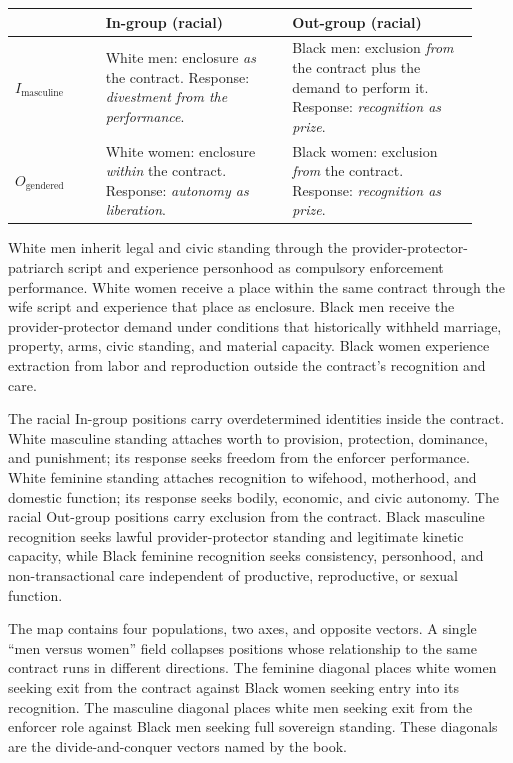 \documentclass[12pt]{article}
\begin{document}
\begin{center}
\small
\renewcommand{\arraystretch}{1.35}
\begin{tabular}{@{}p{0.18\linewidth}p{0.37\linewidth}p{0.37\linewidth}@{}}
\toprule
 & \textbf{In-group (racial)} & \textbf{Out-group (racial)} \\
\midrule
$I_{\text{masculine}}$ & White men: enclosure \textit{as} the contract. Response: \textit{divestment from the performance}. & Black men: exclusion \textit{from} the contract plus the demand to perform it. Response: \textit{recognition as prize}. \\
\addlinespace
$O_{\text{gendered}}$ & White women: enclosure \textit{within} the contract. Response: \textit{autonomy as liberation}. & Black women: exclusion \textit{from} the contract. Response: \textit{recognition as prize}. \\
\bottomrule
\end{tabular}
\end{center}

White men inherit legal and civic standing through the provider-protector-patriarch script and experience personhood as compulsory enforcement performance. White women receive a place within the same contract through the wife script and experience that place as enclosure. Black men receive the provider-protector demand under conditions that historically withheld marriage, property, arms, civic standing, and material capacity. Black women experience extraction from labor and reproduction outside the contract's recognition and care.

The racial In-group positions carry overdetermined identities inside the contract. White masculine standing attaches worth to provision, protection, dominance, and punishment; its response seeks freedom from the enforcer performance. White feminine standing attaches recognition to wifehood, motherhood, and domestic function; its response seeks bodily, economic, and civic autonomy. The racial Out-group positions carry exclusion from the contract. Black masculine recognition seeks lawful provider-protector standing and legitimate kinetic capacity, while Black feminine recognition seeks consistency, personhood, and non-transactional care independent of productive, reproductive, or sexual function.

The map contains four populations, two axes, and opposite vectors. A single “men versus women” field collapses positions whose relationship to the same contract runs in different directions. The feminine diagonal places white women seeking exit from the contract against Black women seeking entry into its recognition. The masculine diagonal places white men seeking exit from the enforcer role against Black men seeking full sovereign standing. These diagonals are the divide-and-conquer vectors named by the book.
\end{document}
